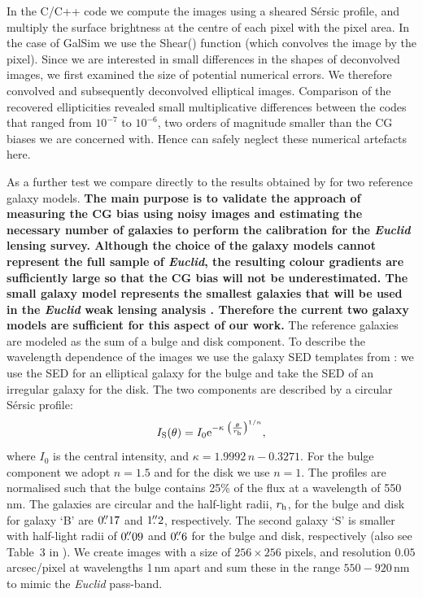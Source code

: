 \documentclass[useAMS,usenatbib]{mnras}
\newcommand{\be}{\begin{equation}}
\newcommand{\ee}{\end{equation}}
\begin{document}
In the C/C++ code we compute the images using a sheared S{\'e}rsic
profile, and multiply the surface brightness at the centre of each
pixel with the pixel area. In the case of {\sc GalSim} we use the {\sc
  Shear()} function (which convolves the image by the pixel). Since we
are interested in small differences in the shapes of deconvolved
images, we first examined the size of potential numerical errors. We
therefore convolved and subsequently deconvolved elliptical
images. Comparison of the recovered ellipticities revealed small
multiplicative differences between the codes that ranged from
$10^{-7}$ to $10^{-6}$, two orders of magnitude smaller than the CG
biases we are concerned with. Hence can safely neglect these numerical
artefacts here.

As a further test we compare directly to the results obtained by  for two reference galaxy models. {\bf The main purpose is to validate the approach of measuring the CG bias using noisy images and estimating the necessary number of galaxies to perform the calibration for the {\it Euclid} lensing survey. Although the choice of the galaxy models cannot represent the full sample of {\it Euclid}, the resulting colour gradients are sufficiently large so that the CG bias will not be underestimated. The small galaxy model represents the smallest galaxies that will be used in the {\it Euclid} weak lensing analysis \citep{Massey13}. Therefore the current two galaxy models are sufficient for this aspect of our work.}
The reference galaxies are modeled as the sum of a bulge and disk component. To describe the wavelength dependence of the images we use the galaxy SED templates from \citet{1980ApJS...43..393C}: we use the SED for an elliptical galaxy for the bulge and take the SED of an irregular galaxy for the disk. The two components are  described by a circular S{\'e}rsic profile:
\be
I_{\rm S}(\theta) = I_0 {\rm e}^{-\kappa\; \left(\frac{\theta}{r_{\rm h}}\right)^{1/n}},
\ee
%
where $I_0$ is the central intensity, and $\kappa=1.9992\,n -0.3271$. For the bulge component we adopt $n=1.5$ and for the disk we use $n=1$. The profiles are normalised such that the bulge contains 25\% of the flux at a wavelength of 550\,nm. The galaxies are circular and the half-light radii, $r_{\rm h}$, for the bulge and disk for galaxy `B'   are $0\hbox{$.\!\!^{\prime\prime}$}17$ and $1\hbox{$.\!\!^{\prime\prime}$}2$, respectively. The second galaxy `S' is smaller with half-light radii of $0\hbox{$.\!\!^{\prime\prime}$}09$ and $0\hbox{$.\!\!^{\prime\prime}$}6$  for the bulge and disk, respectively (also see Table~3 in ). We create images with a size of  $256\times256$ pixels, and resolution $0.05$ arcsec/pixel at wavelengths 1\,nm apart and sum these in the range $550-920$\,nm to mimic the {\it Euclid} pass-band.
\end{document}
